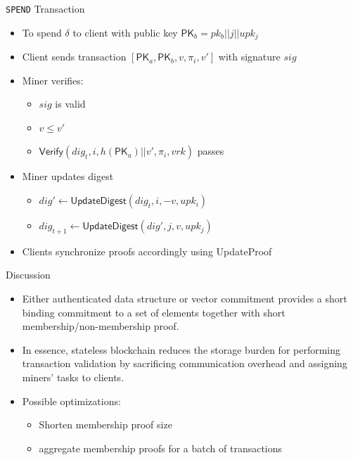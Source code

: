 \documentclass[biblatex,aspectratio=169,11pt]{mybeamer}
\begin{document}
\begin{frame}{\texttt{SPEND} Transaction}
  \begin{itemize}
    \item To spend $\delta$ to client with public key $\textsf{PK}_b = pk_b || j || upk_j$
    \item Client sends transaction $[\textsf{PK}_a, \textsf{PK}_b, v, \pi_i, v']$ with signature $sig$
    \item Miner verifies:
      \begin{itemize}
        \item $sig$ is valid
        \item $v \leq v'$
        \item $\textsf{Verify}(dig_t, i, h(\textsf{PK}_a) || v', \pi_i, vrk)$ passes
      \end{itemize}
    \item Miner updates digest
      \begin{itemize}
        \item $dig' \gets \textsf{UpdateDigest}(dig_t, i, -v, upk_i)$
        \item $dig_{t+1} \gets \textsf{UpdateDigest}(dig', j, v, upk_j)$
      \end{itemize}
    \item Clients synchronize proofs accordingly using UpdateProof
  \end{itemize}
\end{frame}

\begin{frame}{Discussion}
  \begin{itemize}[<+->]
    \item Either authenticated data structure or vector commitment provides a \alert{short binding commitment} to a set of elements together with short \alert{membership/non-membership proof}.
    \item In essence, stateless blockchain reduces the storage burden for performing transaction validation by \alert{sacrificing communication overhead and assigning miners' tasks to clients}.
    \item Possible optimizations: 
     \begin{itemize}[<+->]
       \item Shorten membership proof size
       \item aggregate membership proofs for a batch of transactions~\cite{boneh2018batching}
     \end{itemize}
  \end{itemize}
\end{frame}
\end{document}

